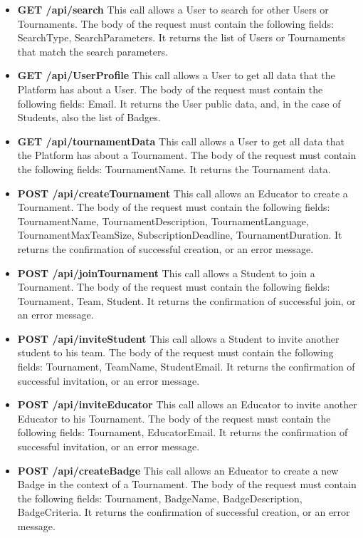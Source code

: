 \begin{itemize}
    \item \textbf{GET /api/search} This call allows a User to search for other Users or Tournaments. The body of the request must contain the following fields: SearchType, SearchParameters. It returns the list of Users or Tournaments that match the search parameters.
    \item \textbf{GET /api/UserProfile} This call allows a User to get all data that the Platform has about a User. The body of the request must contain the following fields: Email. It returns the User public data, and, in the case of Students, also the list of Badges.
    \item \textbf{GET /api/tournamentData} This call allows a User to get all data that the Platform has about a Tournament. The body of the request must contain the following fields: TournamentName. It returns the Tournament data.
    \item \textbf{POST /api/createTournament} This call allows an Educator to create a Tournament. The body of the request must contain the following fields: TournamentName, TournamentDescription, TournamentLanguage, TournamentMaxTeamSize, SubscriptionDeadline, TournamentDuration. It returns the confirmation of successful creation, or an error message.
    \item \textbf{POST /api/joinTournament} This call allows a Student to join a Tournament. The body of the request must contain the following fields: Tournament, Team, Student. It returns the confirmation of successful join, or an error message.
    \item \textbf{POST /api/inviteStudent} This call allows a Student to invite another student to his team. The body of the request must contain the following fields: Tournament, TeamName, StudentEmail. It returns the confirmation of successful invitation, or an error message.
    \item \textbf{POST /api/inviteEducator} This call allows an Educator to invite another Educator to his Tournament. The body of the request must contain the following fields: Tournament, EducatorEmail. It returns the confirmation of successful invitation, or an error message.
    \item \textbf{POST /api/createBadge} This call allows an Educator to create a new Badge in the context of a Tournament. The body of the request must contain the following fields: Tournament, BadgeName, BadgeDescription, BadgeCriteria. It returns the confirmation of successful creation, or an error message.

\end{itemize}
